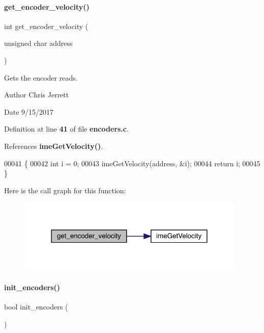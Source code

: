 \paragraph{get\+\_\+encoder\+\_\+velocity()}
{\footnotesize\ttfamily int get\+\_\+encoder\+\_\+velocity (\begin{DoxyParamCaption}\item[{unsigned char}]{address }\end{DoxyParamCaption})}



Gets the encoder reads. 

\begin{DoxyAuthor}{Author}
Chris Jerrett 
\end{DoxyAuthor}
\begin{DoxyDate}{Date}
9/15/2017 
\end{DoxyDate}


Definition at line \textbf{ 41} of file \textbf{ encoders.\+c}.



References \textbf{ ime\+Get\+Velocity()}.


\begin{DoxyCode}
00041                                                 \{
00042   \textcolor{keywordtype}{int} i = 0;
00043   imeGetVelocity(address, &i);
00044   \textcolor{keywordflow}{return} i;
00045 \}
\end{DoxyCode}
Here is the call graph for this function\+:
\nopagebreak
\begin{figure}[H]
\begin{center}
\leavevmode
\includegraphics[width=309pt]{encoders_8h_a8e6b77703c5cf18e00709b052fb4bf22_cgraph}
\end{center}
\end{figure}
\mbox{\label{encoders_8h_aa6ec1ca17e907babd52803ecba451cd3}} 
\paragraph{init\+\_\+encoders()}
{\footnotesize\ttfamily bool init\+\_\+encoders (\begin{DoxyParamCaption}{ }\end{DoxyParamCaption})}



